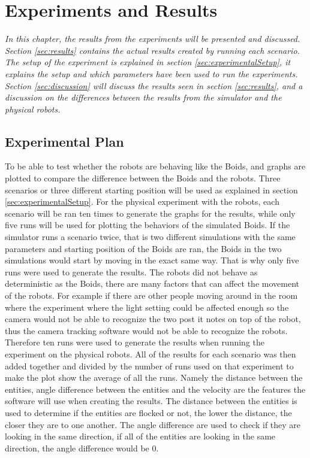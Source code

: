 \chapter{Experiments and Results}
\label{cha:ResearchAndResults}

{\it In this chapter, the results from the experiments will be presented and discussed. Section \ref{sec:results} contains the actual results created by running each scenario. The setup of the experiment is explained in section \ref{sec:experimentalSetup}, it explains the setup and which parameters have been used to run the experiments.
Section \ref{sec:discussion} will discuss the results seen in section \ref{sec:results}, and a discussion on the differences between the results from the simulator and the physical robots.}

\section{Experimental Plan}
\label{sec:experimentalPlan}
To be able to test whether the robots are behaving like the Boids, and graphs are plotted to compare the difference between the Boids and the robots. 
Three scenarios or three different starting position will be used as explained in section \ref{sec:experimentalSetup}.
For the physical experiment with the robots, each scenario will be ran ten times to generate the graphs for the results, while only five runs will be used for plotting the behaviors of the simulated Boids. 
If the simulator runs a scenario twice, that is two different simulations with the same parameters and starting position of the Boids are ran, the Boids in the two simulations would start by moving in the exact same way. That is why only five runs were used to generate the results.
The robots did not behave as deterministic as the Boids, there are many factors that can affect the movement of the robots. For example if there are other people moving around in the room where the experiment where the light setting could be affected enough so the camera would not be able to recognize the two post it notes on top of the robot, thus the camera tracking software would not be able to recognize the robots.
Therefore ten runs were used to generate the results when running the experiment on the physical robots. 
All of the results for each scenario was then added together and divided by the number of runs used on that experiment to make the plot show the average of all the runs.
Namely the distance between the entities, angle difference between the entities and the velocity are the features the software will use when creating the results.
The distance between the entities is used to determine if the entities are flocked or not, the lower the distance, the closer they are to one another.
The angle difference are used to check if they are looking in the same direction, if all of the entities are looking in the same direction, the angle difference would be 0.

